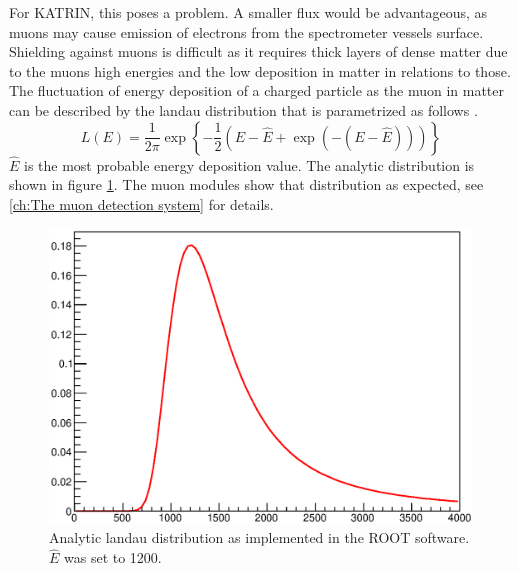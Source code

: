     For KATRIN, this poses a problem. A smaller flux would be advantageous, as muons may cause emission of electrons from the spectrometer vessels surface. Shielding against muons is difficult as it requires thick layers of dense matter due to the muons high energies and the low deposition in matter in relations to those.
    The fluctuation of energy deposition of a charged particle as the muon in matter can be described by the landau distribution that is parametrized as follows \cite{Grupen}.
    \begin{equation}
    	L(E) = \frac{1}{2\pi}\exp{\left\{-\frac{1}{2}\left(E- \hat E + \exp \left(-(E-\hat E)\right)\right)\right\}}
    \end{equation}
	$\hat E$ is the most probable energy deposition value. The analytic distribution is shown in figure \ref{fig:Introduction:landauDistribution}. The muon modules show that distribution as expected, see \ref{ch:The muon detection system} for details.
	\begin{figure}[H]
	\centering
		\includegraphics[width = 0.9 \textwidth]{graphics/cosmicRays/TMathLandauRoot.eps}
		\caption[Landau distribution]{Analytic landau distribution as implemented in the ROOT software. $\hat E$ was set to 1200.}
		\label{fig:Introduction:landauDistribution}
	\end{figure}

    
   